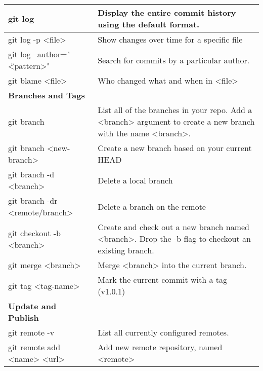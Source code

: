 \begin{longtable}{| p{} | p{} |}
    \hline
    git log&
    Display the entire commit history using the default format.
    \\ \hline 
    
    git log -p <file>&
    Show changes over time for a specific file 
    \\ \hline
    
    git log --author="\"<pattern>"&
    Search for commits by a particular author. 
    \\ \hline
        
    git blame <file>& 
    Who changed what and when in <file>
    \\ \hline \hline

   \textbf{Branches and Tags}&  
    \\ \hline

    \hline
    git branch&
    List all of the branches in your repo. Add a <branch> argument to
    create a new branch with the name <branch>.
    \\ \hline 
    
    git branch <new-branch>&
    Create a new branch based
    on your current HEAD
    \\ \hline
    
    git branch -d <branch>&
    Delete a local branch
    \\ \hline   
    
    git branch -dr <remote/branch>&
    Delete a branch on the remote
    \\ \hline
        
    git checkout -b <branch>&
    Create and check out a new branch named <branch>. Drop the -b
    flag to checkout an existing branch.
    \\ \hline 
    
    git merge <branch>&
    Merge <branch> into the current branch.
    \\ \hline
    
    git tag <tag-name>&
    Mark the current commit with a tag (v1.0.1)
    \\ \hline  \hline
      
    \textbf{Update and Publish}&
    \\\hline 

    \hline
    git remote -v&
    List all currently configured remotes.
    \\ \hline 
    
    git remote add <name> <url>& 
    Add new remote repository, named <remote>
    \\ \hline 
    

\end{longtable}

